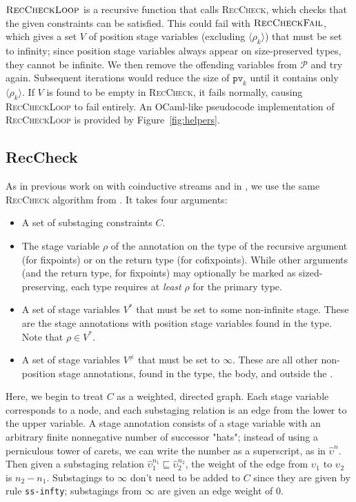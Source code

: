 \documentclass[sigplan,10pt,anonymous,review,nonacm]{acmart}
\begin{document}
$\textsc{RecCheckLoop}$ is a recursive function that calls \textsc{RecCheck}, which checks that the given constraints can be satisfied. This could fail with $\textsc{RecCheckFail}$, which gives a set $V$ of position stage variables (excluding $\langle \rho_k \rangle$) that must be set to infinity; since position stage variables always appear on size-preserved types, they cannot be infinite. We then remove the offending variables from $\mathcal{P}$ and try again. Subsequent iterations would reduce the size of $\texttt{pv}_k$ until it contains only $\langle \rho_k \rangle$. If $V$ is found to be empty in \textsc{RecCheck}, it fails normally, causing \textsc{RecCheckLoop} to fail entirely. An OCaml-like pseudocode implementation of \textsc{RecCheckLoop} is provided by Figure~\ref{fig:helpers}.

\subsection{RecCheck}

As in previous work on \CChatomega with coinductive streams \cite{cc-hat-omega} and in \CIChat, we use the same \textsc{RecCheck} algorithm from \Fhat \cite{f-hat}. It takes four arguments:

\begin{itemize}
    \item A set of substaging constraints $C$.
    \item The stage variable $\rho$ of the annotation on the type of the recursive argument (for fixpoints) or on the return type (for cofixpoints). While other arguments (and the return type, for fixpoints) may optionally be marked as sized-preserving, each \cofixpoint type requires at \textit{least} $\rho$ for the primary \corecursive type.
    \item A set of stage variables $V^*$ that must be set to some non-infinite stage. These are the stage annotations with position stage variables found in the \cofixpoint type. Note that $\rho \in V^*$.
    \item A set of stage variables $V^\neq$ that must be set to $\infty$. These are all other non-position stage annotations, found in the \cofixpoint type, the \cofixpoint body, and outside the \cofixpoint.
\end{itemize}

Here, we begin to treat $C$ as a weighted, directed graph. Each stage variable corresponds to a node, and each substaging relation is an edge from the lower to the upper variable. A stage annotation consists of a stage variable with an arbitrary finite nonnegative number of successor "hats"; instead of using a perniculous tower of carets, we can write the number as a superscript, as in $\hat{\upsilon}^n$. Then given a substaging relation $\hat{\upsilon}_1^{n_1} \sqsubseteq \hat{\upsilon}_2^{n_2}$, the weight of the edge from $\upsilon_1$ to $\upsilon_2$ is $n_2 - n_1$. Substagings to $\infty$ don't need to be added to $C$ since they are given by rule \texttt{ss-infty}; substagings from $\infty$ are given an edge weight of $0$.
\end{document}
